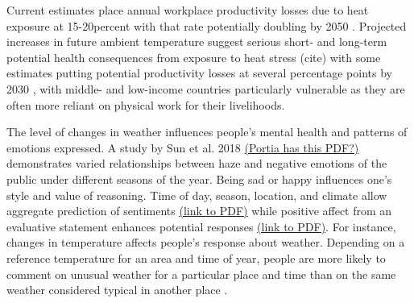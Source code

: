 \documentclass{article}
\begin{document}
Current estimates place annual workplace productivity losses due to heat exposure at 15-20percent with that rate potentially doubling by 2050 \cite{kjellstrom_heat_2016}. Projected increases in future ambient temperature suggest serious short- and long-term potential health consequences from exposure to heat stress (cite) with some estimates putting potential productivity losses at several percentage points by 2030 \cite{kjellstrom_heat_2016}, with middle- and low-income countries particularly vulnerable as they are often more reliant on physical work for their livelihoods. 

The level of changes in weather influences people’s mental health and patterns of emotions expressed. A study by Sun et al. 2018 \href{file:///Users/portia/Downloads/ijerph-16-00086-v2 20(1).pdf.}{(Portia has this PDF?)} demonstrates varied relationships between haze and negative emotions of the public under different seasons of the year. Being sad or happy influences one's style and value of reasoning. Time of day, season, location, and climate allow aggregate prediction of sentiments \cite{hannak_tweetin_2012} \href{https://www.ccs.neu.edu/~amislove/publications/Weather-ICWSM.pdf}{(link to PDF)} while positive affect from an evaluative statement enhances potential responses \cite{clore_how_2007} \href{https://www.ncbi.nlm.nih.gov/pmc/articles/PMC2483304/pdf/nihms40349.pdf}{(link to PDF)}. For instance, changes in temperature affects people’s response about weather. Depending on a reference temperature for an  area and time of year, people are more likely to comment on unusual weather for a particular place and time than on the same weather considered typical in another place \cite{moore_rapidly_2019}.
\end{document}
